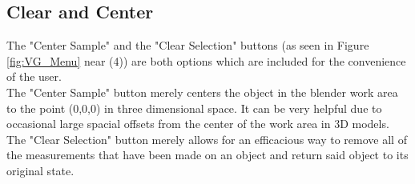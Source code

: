 \documentclass[11pt,leqno]{article}
\theoremstyle{definition}
\begin{document}


\subsection{Clear and Center\texorpdfstring{\clear}{clear}}

The "Center Sample" and the "Clear Selection" buttons (as seen in Figure \ref{fig:VG_Menu} near (4)) are both options which are included for the convenience of the user.\\

The "Center Sample" button merely centers the object in the blender work area to the point (0,0,0) in three dimensional space. It can be very helpful due to occasional large spacial offsets from the center of the work area in 3D models.\\

The "Clear Selection" button merely allows for an efficacious way to remove all of the measurements that have been made on an object and return said object to its original state.




%
%
\end{document}
